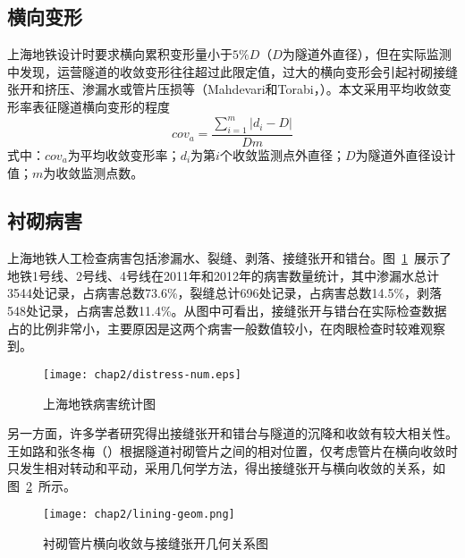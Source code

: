 \subsection{横向变形}

上海地铁设计时要求横向累积变形量小于$5\%D$（$D$为隧道外直径），但在实际监测中发现，运营隧道的收敛变形往往超过此限定值，过大的横向变形会引起衬砌接缝张开和挤压、渗漏水或管片压损等（Mahdevari和Torabi，\citeyear{mahdevari2012prediction}）。本文采用平均收敛变形率表征隧道横向变形的程度
\begin{equation}
    \label{equ:conv_ave}
    {{cov}_{a}}=\frac{\sum\limits_{i=1}^{m}{\left| {{d}_{i}}-D \right|}}{Dm}
\end{equation}
式中：${cov}_{a}$为平均收敛变形率；${d}_{i}$为第$i$个收敛监测点外直径；$D$为隧道外直径设计值；$m$为收敛监测点数。

\subsection{衬砌病害}

上海地铁人工检查病害包括渗漏水、裂缝、剥落、接缝张开和错台。图~\ref{fig:上海地铁病害统计图}~展示了地铁1号线、2号线、4号线在2011年和2012年的病害数量统计，其中渗漏水总计3544处记录，占病害总数73.6\%，裂缝总计696处记录，占病害总数14.5\%，剥落548处记录，占病害总数11.4\%。从图中可看出，接缝张开与错台在实际检查数据占的比例非常小，主要原因是这两个病害一般数值较小，在肉眼检查时较难观察到。

\begin{figure}[htbp]
    \centering
    \texttt{[image: chap2/distress-num.eps]}
    \caption{上海地铁病害统计图}
    \label{fig:上海地铁病害统计图}
\end{figure}

另一方面，许多学者研究得出接缝张开和错台与隧道的沉降和收敛有较大相关性。王如路和张冬梅（\citeyear{王如路2013超载作用下软土盾构隧道横向变形机理及控制指标研究}）根据隧道衬砌管片之间的相对位置，仅考虑管片在横向收敛时只发生相对转动和平动，采用几何学方法，得出接缝张开与横向收敛的关系，如图~\ref{fig:衬砌管片横向收敛与接缝张开几何关系图}~所示。

\begin{figure}[htbp]
    \centering
    \texttt{[image: chap2/lining-geom.png]}
    \caption{衬砌管片横向收敛与接缝张开几何关系图}
    \label{fig:衬砌管片横向收敛与接缝张开几何关系图}
\end{figure}

